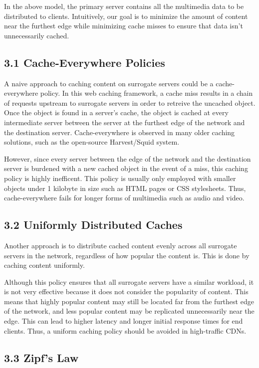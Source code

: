 \documentclass[
	a4paper, %
	10pt, %
	unnumberedsections, %
	twoside, %
]{LTJournalArticle}
\begin{document}
In the above model, the primary server contains all the multimedia data to be distributed to clients. Intuitively, our goal is to minimize the amount of content near the furthest edge while minimizing cache misses to ensure that data isn't unnecessarily cached. 

\subsection{3.1 Cache-Everywhere Policies }

A naive approach to caching content on surrogate servers could be a cache-everywhere policy. In this web caching framework, a cache miss results in a chain of requests upstream to surrogate servers in order to retreive the uncached object. Once the object is found in a server's cache, the object is cached at every intermediate server between the server at the furthest edge of the network and the destination server. Cache-everywhere is observed in many older caching solutions, such as the open-source Harvest/Squid system. 

However, since every server between the edge of the network and the destination server is burdened with a new cached object in the event of a miss, this caching policy is highly inefficent. This policy is usually only employed with smaller objects under 1 kilobyte in size such as HTML pages or CSS stylesheets. Thus, cache-everywhere fails for longer forms of multimedia such as audio and video. 

\subsection{3.2 Uniformly Distributed Caches}

Another approach is to distribute cached content evenly across all surrogate servers in the network, regardless of how popular the content is. This is done by caching content uniformly. 

Although this policy ensures that all surrogate servers have a similar workload, it is not very effective because it does not consider the popularity of content. This means that highly popular content may still be located far from the furthest edge of the network, and less popular content may be replicated unnecessarily near the edge. This can lead to higher latency and longer initial response times for end clients. Thus, a uniform caching policy should be avoided in high-traffic CDNs. 

\subsection{3.3 Zipf's Law}
\end{document}

